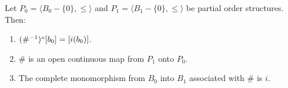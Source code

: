 Let $P_0 = \langle B_0 - \{0\}, \leq \rangle$ and $P_1 = \langle B_1 - \{0\}, \leq \rangle$ be partial order structures. Then:

\begin{enumerate}
\item $(\#^{-1})``[b_0] = [i(b_0)]$.
\item $\#$ is an open continuous map from $P_1$ onto $P_0$.
\item The complete monomorphism from $B_0$ into $B_1$ associated with $\#$ is $i$.
\end{enumerate}

